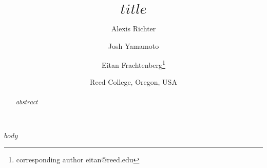 \documentclass[12pt]{article}
\title{$title$}
\author{Alexis Richter \and Josh Yamamoto \and Eitan Frachtenberg\thanks{corresponding author eitan@reed.edu}}
\date{Reed College, Oregon, USA}
\begin{document}
\maketitle

\begin{abstract}
  $abstract$
\end{abstract}

$body$

\newpage{}



\end{document}
